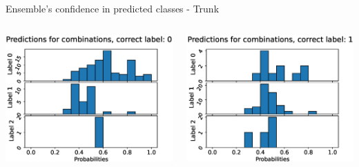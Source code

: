 \begin{frame}[fragile]{Ensemble's confidence in predicted classes - Trunk}
  \begin{columns}[T,onlytextwidth]
      \includegraphics[width=\textwidth]{files/figs/res/trunk/pc0.eps}

      \includegraphics[width=\textwidth]{files/figs/res/trunk/pc1.eps}


\end{columns}
\end{frame}
